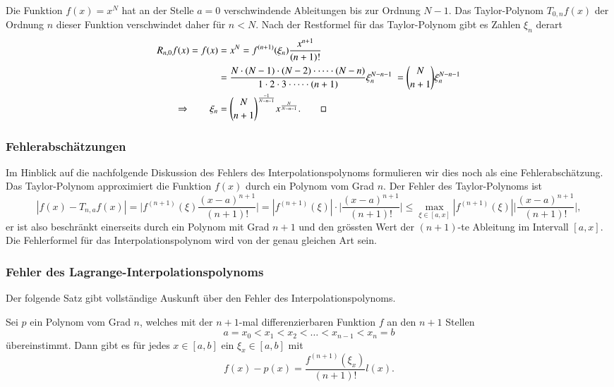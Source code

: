\begin{beispiel}
Die Funktion $f(x)=x^N$ hat an der Stelle $a=0$ verschwindende
Ableitungen bis zur Ordnung $N-1$.
Das Taylor-Polynom $T_{0,n}f(x)$ der Ordnung $n$ dieser Funktion
verschwindet daher für $n<N$.
Nach der Restformel für das Taylor-Polynom gibt es Zahlen $\xi_n$ derart
\begin{align*}
R_{n,0}f(x)
=
f(x)
&=
x^N
= 
f^{(n+1)}(\xi_n) \frac{x^{n+1}}{(n+1)!}
\\
&=
\frac{
N\cdot(N-1)\cdot(N-2)\cdot\dots\cdot(N-n)
}{
1\cdot 2 \cdot 3 \cdot\dots \cdot (n+1)
}
\xi_n^{N-n-1} 
=
\binom{N}{n+1} \xi_n^{N-n-1}
\\
\Rightarrow\qquad
\xi_n
&=
\binom{N}{n+1}^{\frac{-1}{N-n-1}} x^{\frac{N}{N-n-1}}.
\qedhere
\end{align*}
\end{beispiel}

\subsubsection{Fehlerabschätzungen}
Im Hinblick auf die nachfolgende Diskussion des Fehlers des
Interpolationspolynoms formulieren wir dies noch als eine
Fehlerabschätzung.
Das Taylor-Polynom approximiert die Funktion $f(x)$ durch ein
Polynom vom Grad $n$.
Der Fehler des Taylor-Polynoms ist
\[
|f(x) - T_{n,a}f(x)|
=
\biggl|
f^{(n+1)}(\xi)
\frac{(x-a)^{n+1}}{(n+1)!}
\biggr|
=
|f^{(n+1)}(\xi)|\cdot
\biggl|
\frac{(x-a)^{n+1}}{(n+1)!}
\biggr|
\le
\max_{\xi\in [a,x]} |f^{(n+1)}(\xi)|
\biggl|
\frac{(x-a)^{n+1}}{(n+1)!}
\biggr|,
\]
er ist also beschränkt einerseits durch ein Polynom mit Grad $n+1$
und den grössten Wert der $(n+1)$-te Ableitung im Intervall $[a,x]$.
Die Fehlerformel für das Interpolationspolynom wird von der genau
gleichen Art sein.

\subsubsection{Fehler des Lagrange-Interpolationspolynoms}
Der folgende Satz gibt vollständige Auskunft über den Fehler des
Interpolationspolynoms.

\begin{satz}
\label{buch:satz:lagrangefehler}
Sei $p$ ein Polynom vom Grad $n$, welches mit der $n+1$-mal differenzierbaren
Funktion $f$ an den $n+1$ Stellen
\[
a = x_0 < x_1 < x_2 < \dots  < x_{n-1} < x_n=b
\]
übereinstimmt.
Dann gibt es für jedes $x\in[a,b]$ ein $\xi_x\in [a,b]$ mit
\begin{equation}
f(x) - p(x) = \frac{f^{(n+1)}(\xi_x)}{(n+1)!} l(x).
\label{buch:equation:polyfehler}
\end{equation}
\end{satz}


